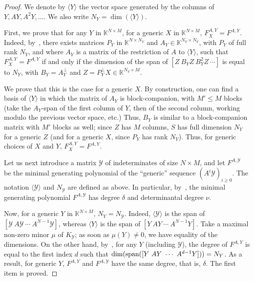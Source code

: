 \documentclass[12pt]{article}
\def\K {\ensuremath{\mathbb{K}}}
\def\K{\mathbb{K}}
\def\scrY{\mathscr{Y}}
\begin{document}
\begin{proof}
	We denote by $\langle Y \rangle$ the vector
	space generated by the columns of $Y,AY,A^2Y,\dots$. We also write
	$N_Y=\dim(\langle Y \rangle)$.
	
	First, we prove that for any $Y$ in $\K^{N \times M}$, for a generic
	$X$ in $\K^{N\times M}$, $F_X^{A,Y}=F^{A,Y}$.  Indeed,
	by~\cite[Lemma~4.2]{Villard97a}, there exists matrices $P_Y$ in
	$\K^{N\times N_Y}$ and $A_Y \in \K^{N_Y \times N_Y}$, with $P_Y$ of
	full rank $N_Y$, and where $A_Y$ is a matrix of the restriction of $A$
	to $\langle Y \rangle$, such that $F_X^{A,Y}=F^{A,Y}$ if and only if
	the dimension of the span of $[Z ~ B_Y Z ~B_Y^2 Z ~ \cdots]$ is equal to
	$N_Y$, with $B_Y=A_Y^\perp$ and $Z=P_Y^\perp X \in \K^{N_Y \times M}$.
	
	We prove that this is the case for a generic $X$. By construction, one
	can find a basis of $\langle Y \rangle$ in which the matrix of $A_Y$
	is block-companion, with $M' \le M$ blocks (take the $A_Y$-span of the
	first column of $Y$, then of the second column, working modulo the
	previous vector space, etc.) Thus, $B_Y$ is similar to a
	block-companion matrix with $M'$ blocks as well; since $Z$ has $M$
	columns, $S$ has full dimension $N_Y$ for a generic $Z$ (and for a
	generic $X$, since $P_Y$ has rank $N_Y$). Thus, for generic choices of
	$X$ and $Y$, $F_X^{A,Y}=F^{A,Y}$.
	
	Let us next introduce a matrix $\scrY$ of indeterminates of size $N
	\times M$, and let $F^{A,\scrY}$ be the minimal generating polynomial
	of the ``generic'' sequence $(A^i \scrY)_{i \ge 0}$. The notation
	$\langle \scrY \rangle$ and $N_\scrY$ are defined as above.  In
	particular, by~\cite[Proposition 6.1]{Villard97a}, the minimal
	generating polynomial $F^{A,\scrY}$ has degree $\delta$ and
	determinantal degree $\nu$.
	
	Now, for a generic $Y$ in $\K^{N\times M}$, $N_Y=N_\scrY$. Indeed,
	$\langle \scrY\rangle$ is the span of $[\scrY ~ A \scrY ~ \cdots ~
	A^{N-1} \scrY]$, whereas $\langle Y\rangle$ is the span of $[Y ~ A Y
	~ \cdots ~A^{N-1} Y]$. Take a maximal non-zero minor $\mu$ of
	$K_\scrY$; as soon as $\mu(Y)\ne 0$, we have equality of the
	dimensions. On the other hand, by~\cite[Lemma~4.3]{Villard97a}, for
	any $Y$ (including $\scrY$), the degree of $F^{A,Y}$ is equal to the
	first index $d$ such that $\dim({\rm span}([Y ~ A Y ~ \cdots ~A^{d-1}
	Y]))=N_Y$. As a result, for generic $Y$, $F^{A,Y}$ and $F^{A,\scrY}$
	have the same degree, that is, $\delta$.  The first item is proved.
	

\end{proof}
\end{document}
